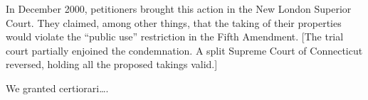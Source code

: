 In December 2000, petitioners brought this action in the New London Superior
Court. They claimed, among other things, that the taking of their properties
would violate the ``public use'' restriction in the Fifth Amendment.
[The trial court partially enjoined the condemnation. A split Supreme Court of
Connecticut reversed, holding all the proposed takings valid.]
%
%
%

We granted certiorari\ldots.


